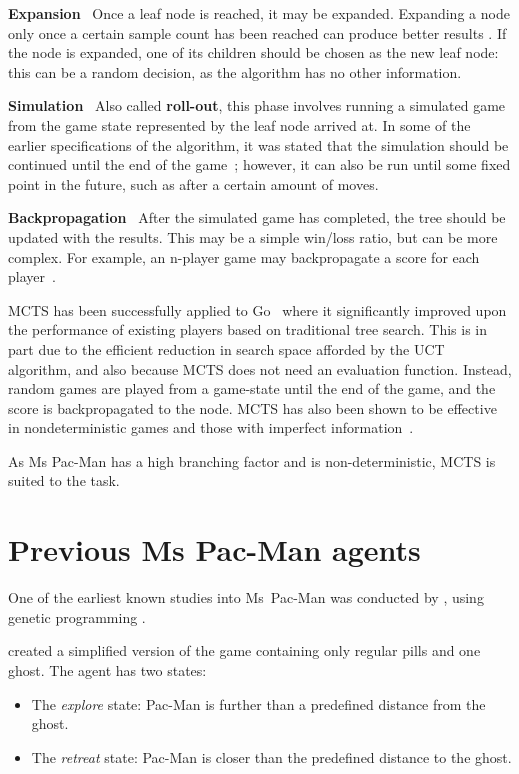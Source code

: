 \textbf{Expansion} ~Once a leaf node is reached, it may be expanded.  Expanding a node only once a certain sample count has been reached can produce better results .  If the node is expanded, one of its children should be chosen as the new leaf node: this can be a random decision, as the algorithm has no other information.

\textbf{Simulation} ~Also called \textbf{roll-out}, this phase involves running a simulated game from the game state represented by the leaf node arrived at.  In some of the earlier specifications of the algorithm, it was stated that the simulation should be continued until the end of the game~\citep{Chaslot2008}; however, it can also be run until some fixed point in the future, such as after a certain amount of moves.

\textbf{Backpropagation} ~After the simulated game has completed, the tree should be updated with the results.  This may be a simple win/loss ratio, but can be more complex.  For example, an n-player game may backpropagate a score for each player~\citep{Samothrakis2011}.

MCTS has been successfully applied to Go~\citep{Gelly2006} where it significantly improved upon the performance of existing players based on traditional tree search.  This is in part due to the efficient reduction in search space afforded by the UCT algorithm, and also because MCTS does not need an evaluation function.  Instead, random games are played from a game-state until the end of the game, and the score is backpropagated to the node.  MCTS has also been shown to be effective in nondeterministic games and those with imperfect information~\citep{Kocsis2006}.

As Ms Pac-Man has a high branching factor and is non-deterministic, MCTS is suited to the task.

\section{Previous Ms Pac-Man agents}

One of the earliest known studies into Ms~Pac-Man was conducted by \citet{Koza1992}, using genetic programming .

\citet{Gallagher2003} created a simplified version of the game containing only regular pills and one ghost.  The agent has two states:

\begin{itemize}
\item The \emph{explore} state: Pac-Man is further than a predefined distance from the ghost.
\item The \emph{retreat} state: Pac-Man is closer than the predefined distance to the ghost.
\end{itemize}

